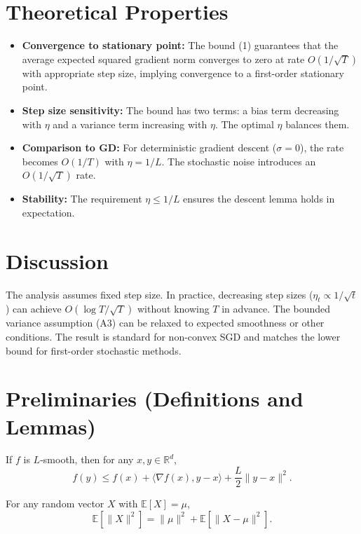\documentclass{article}
\begin{document}
\section*{Theoretical Properties}
\begin{itemize}
    \item \textbf{Convergence to stationary point:} The bound (1) guarantees that the average expected squared gradient norm converges to zero at rate $O(1/\sqrt{T})$ with appropriate step size, implying convergence to a first-order stationary point.
    \item \textbf{Step size sensitivity:} The bound has two terms: a bias term decreasing with $\eta$ and a variance term increasing with $\eta$. The optimal $\eta$ balances them.
    \item \textbf{Comparison to GD:} For deterministic gradient descent ($\sigma=0$), the rate becomes $O(1/T)$ with $\eta = 1/L$. The stochastic noise introduces an $O(1/\sqrt{T})$ rate.
    \item \textbf{Stability:} The requirement $\eta \leq 1/L$ ensures the descent lemma holds in expectation.
\end{itemize}

\section*{Discussion}
The analysis assumes fixed step size. In practice, decreasing step sizes ($\eta_t \propto 1/\sqrt{t}$) can achieve $O(\log T/\sqrt{T})$ without knowing $T$ in advance. The bounded variance assumption (A3) can be relaxed to expected smoothness or other conditions. The result is standard for non-convex SGD and matches the lower bound for first-order stochastic methods.

\section*{Preliminaries (Definitions and Lemmas)}
\begin{lemma}
If $f$ is $L$-smooth, then for any $x, y \in \mathbb{R}^d$,
\begin{equation}
    f(y) \leq f(x) + \langle \nabla f(x), y-x \rangle + \frac{L}{2} \|y-x\|^2.
\end{equation}
\end{lemma}

\begin{lemma}
For any random vector $X$ with $\mathbb{E}[X] = \mu$,
\begin{equation}
    \mathbb{E}[\|X\|^2] = \|\mu\|^2 + \mathbb{E}[\|X - \mu\|^2].
\end{equation}
\end{lemma}
\end{document}
